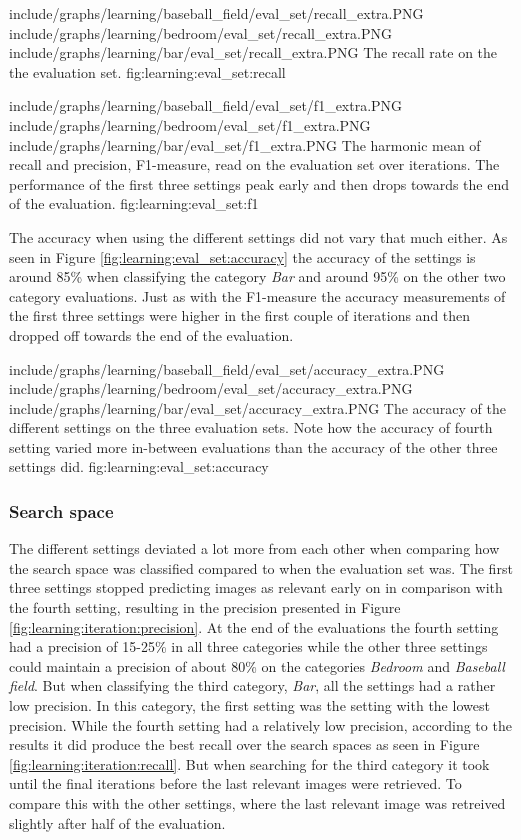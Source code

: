 \tripfigurenear
{include/graphs/learning/baseball_field/eval_set/recall_extra.PNG}
{include/graphs/learning/bedroom/eval_set/recall_extra.PNG}
{include/graphs/learning/bar/eval_set/recall_extra.PNG}
{The recall rate on the the evaluation set.}
{fig:learning:eval_set:recall}

\tripfigurenear
{include/graphs/learning/baseball_field/eval_set/f1_extra.PNG}
{include/graphs/learning/bedroom/eval_set/f1_extra.PNG}
{include/graphs/learning/bar/eval_set/f1_extra.PNG}
{The harmonic mean of recall and precision, F1-measure, read on the evaluation set over iterations. The performance of the first three settings peak early and then drops towards the end of the evaluation.}
{fig:learning:eval_set:f1}

The accuracy when using the different settings did not vary that much either. As seen in Figure \ref{fig:learning:eval_set:accuracy} the accuracy of the settings is around 85\% when classifying the category \emph{Bar} and around 95\% on the other two category evaluations. Just as with the F1-measure the accuracy measurements of the first three settings were higher in the first couple of iterations and then dropped off towards the end of the evaluation. 

\tripfigure
{include/graphs/learning/baseball_field/eval_set/accuracy_extra.PNG}
{include/graphs/learning/bedroom/eval_set/accuracy_extra.PNG}
{include/graphs/learning/bar/eval_set/accuracy_extra.PNG}
{The accuracy of the different settings on the three evaluation sets. Note how the accuracy of fourth setting varied more in-between evaluations than the accuracy of the other three settings did.}
{fig:learning:eval_set:accuracy}

\subsubsection{Search space}
\label{sec:res:learning:iter}
The different settings deviated a lot more from each other when comparing how the search space was classified compared to when the evaluation set was. The first three settings stopped predicting images as relevant early on in comparison with the fourth setting, resulting in the precision presented in Figure \ref{fig:learning:iteration:precision}. At the end of the evaluations the fourth setting had a precision of 15-25\% in all three categories while the other three settings could maintain a precision of about 80\% on the categories \emph{Bedroom} and \emph{Baseball field}. But when classifying the third category, \emph{Bar}, all the settings had a rather low precision. In this category, the first setting was the setting with the lowest precision. While the fourth setting had a relatively low precision, according to the results it did produce the best recall over the search spaces as seen in Figure \ref{fig:learning:iteration:recall}. But when searching for the third category it took until the final iterations before the last relevant images were retrieved. To compare this with the other settings, where the last relevant image was retreived slightly after half of the evaluation. 

